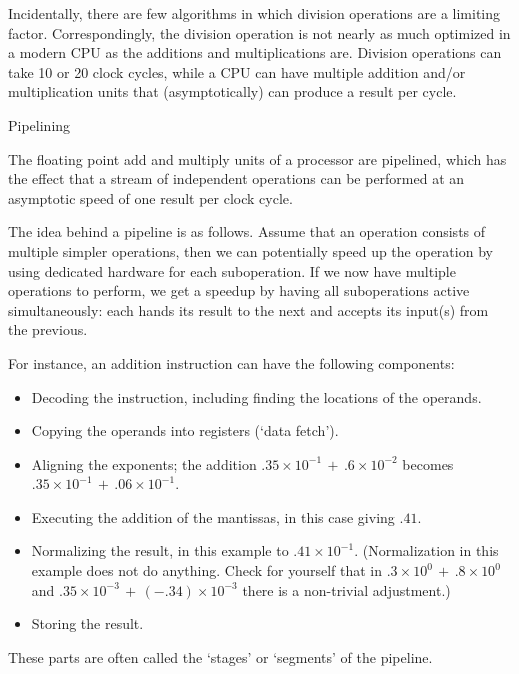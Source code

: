 Incidentally, there are few algorithms in which division operations
are a limiting factor. Correspondingly, the division operation is not
nearly as much optimized in a modern \ac{CPU} as the additions and
multiplications are. Division operations can take 10 or 20 clock
cycles, while a \ac{CPU} can have multiple addition and/or multiplication
units that (asymptotically) can produce a result per cycle.


 {Pipelining}
\label{sec:pipeline}

The floating point add and multiply units of a processor are
pipelined, which has the effect that a stream of independent
operations can be performed at an asymptotic speed of one result per
clock cycle.

The idea behind a pipeline is as follows.
Assume that an operation consists of multiple
simpler operations, then we can potentially speed up the operation
by using dedicated hardware for each suboperation.
If we now have multiple operations to perform,
we get a speedup by having all suboperations active simultaneously:
each hands its result to the next and accepts its input(s) from the previous.

For instance, an addition instruction can have the following components:
\begin{itemize}
\item Decoding the instruction, including finding the locations of the
  operands.
\item Copying the operands into registers (`data fetch').
\item Aligning the exponents; the addition
  $.35\times 10^{-1}\,+\, .6\times 10^{-2}$ becomes 
  $.35\times 10^{-1}\,+\, .06\times 10^{-1}$.
\item Executing the addition of the mantissas, in this case giving 
  $.41$.
\item Normalizing the result, in this example to $.41\times
  10^{-1}$. (Normalization in this example does not do anything. Check
  for yourself that in 
  $.3\times10^0\,+\,.8\times 10^0$ and 
  $.35\times10^{-3}\,+\,(-.34)\times 10^{-3}$ there is a non-trivial
  adjustment.)
\item Storing the result.
\end{itemize}
These parts are often called the `stages' or `segments' of the pipeline.

